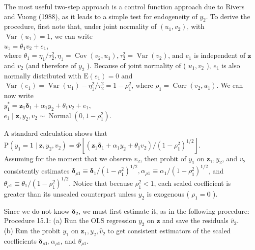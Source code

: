 \documentclass[10pt]{article}
\begin{document}
The most useful two-step approach is a control function approach due to Rivers and Vuong (1988), as it leads to a simple test for endogeneity of $y_{2}$. To derive the procedure, first note that, under joint normality of $\left(u_{1}, v_{2}\right)$, with $\operatorname{Var}\left(u_{1}\right)=1$, we can write\\
$u_{1}=\theta_{1} v_{2}+e_{1}$,\\
where $\theta_{1}=\eta_{1} / \tau_{2}^{2}, \eta_{1}=\operatorname{Cov}\left(v_{2}, u_{1}\right), \tau_{2}^{2}=\operatorname{Var}\left(v_{2}\right)$, and $e_{1}$ is independent of $\mathbf{z}$ and $v_{2}$ (and therefore of $y_{2}$ ). Because of joint normality of ( $u_{1}, v_{2}$ ), $e_{1}$ is also normally distributed with $\mathrm{E}\left(e_{1}\right)=0$ and $\operatorname{Var}\left(e_{1}\right)=\operatorname{Var}\left(u_{1}\right)-\eta_{1}^{2} / \tau_{2}^{2}=1-\rho_{1}^{2}$, where $\rho_{1}= \operatorname{Corr}\left(v_{2}, u_{1}\right)$. We can now write\\
$y_{1}^{*}=\mathbf{z}_{1} \boldsymbol{\delta}_{1}+\alpha_{1} y_{2}+\theta_{1} v_{2}+e_{1}$,\\
$e_{1} \mid \mathbf{z}, y_{2}, v_{2} \sim \operatorname{Normal}\left(0,1-\rho_{1}^{2}\right)$.

A standard calculation shows that\\
$\mathrm{P}\left(y_{1}=1 \mid \mathbf{z}, y_{2}, v_{2}\right)=\Phi\left[\left(\mathbf{z}_{1} \boldsymbol{\delta}_{1}+\alpha_{1} y_{2}+\theta_{1} v_{2}\right) /\left(1-\rho_{1}^{2}\right)^{1 / 2}\right]$.\\
Assuming for the moment that we observe $v_{2}$, then probit of $y_{1}$ on $\mathbf{z}_{1}, y_{2}$, and $v_{2}$ consistently estimates $\boldsymbol{\delta}_{\rho 1} \equiv \boldsymbol{\delta}_{1} /\left(1-\rho_{1}^{2}\right)^{1 / 2}, \alpha_{\rho 1} \equiv \alpha_{1} /\left(1-\rho_{1}^{2}\right)^{1 / 2}$, and $\theta_{\rho 1} \equiv \theta_{1} /\left(1-\rho_{1}^{2}\right)^{1 / 2}$. Notice that because $\rho_{1}^{2}<1$, each scaled coefficient is greater than its unscaled counterpart unless $y_{2}$ is exogenous ( $\rho_{1}=0$ ).

Since we do not know $\boldsymbol{\delta}_{2}$, we must first estimate it, as in the following procedure:\\
Procedure 15.1: (a) Run the OLS regression $y_{2}$ on $\mathbf{z}$ and save the residuals $\hat{v}_{2}$.\\
(b) Run the probit $y_{1}$ on $\mathbf{z}_{1}, y_{2}, \hat{v}_{2}$ to get consistent estimators of the scaled coefficients $\boldsymbol{\delta}_{\rho 1}, \alpha_{\rho 1}$, and $\theta_{\rho 1}$.
\end{document}
